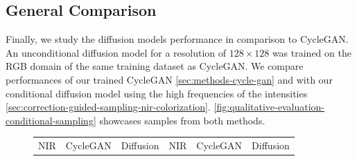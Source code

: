 \subsection{General Comparison}
\label{sec:diffusion-vs-cyclegan-night}
Finally, we study the diffusion models performance in comparison to CycleGAN.
An unconditional diffusion model for a resolution of $128 \times 128$ was trained on the RGB domain of the same training dataset as CycleGAN.
We compare performances of our trained CycleGAN \autoref{sec:methods-cycle-gan} and with our conditional diffusion model using the high frequencies of the intensities \autoref{sec:correction-guided-sampling-nir-colorization}.
\autoref{fig:qualitative-evaluation-conditional-sampling} showcases samples from both methods.

\begin{figure}
    \centering
    \begin{tabularx}{\textwidth}{Y Y Y !{\space} Y Y Y}
        NIR                                                                                  & CycleGAN                                                                                       & Diffusion                                                                                  & NIR                                                                                  & CycleGAN                                                                                       & Diffusion                                                                                  \\

\end{tabularx}
\end{figure}
